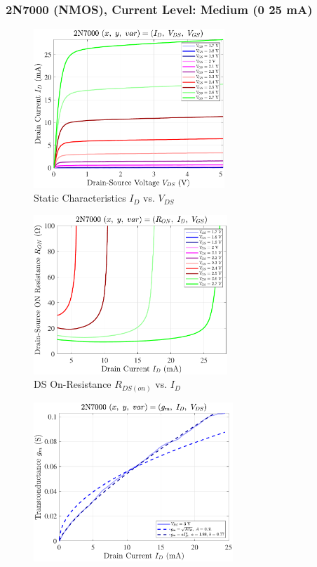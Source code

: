 \documentclass[UTF8]{article}
\begin{document}

\newpage
\subsubsection{2N7000 (NMOS), Current Level: Medium (0 \~ 25 mA)}

\begin{center}
\noindent\begin{minipage}{0.45\columnwidth}
    \begin{figure}[H]\centering
        \includegraphics[height=170pt]{LCE-04-场效应管/assets/2N7000/2N7000 (NMOS) [onsemi, KH32] current level mid (0~25mA)/2025-04-24_00-04-22__stc_Id_Vds_Vgs.pdf}
        \caption{Static Characteristics $I_D$ vs. $V_{DS}$}
    \end{figure}
    \begin{figure}[H]\centering
        \includegraphics[height=170pt]{LCE-04-场效应管/assets/2N7000/2N7000 (NMOS) [onsemi, KH32] current level mid (0~25mA)/2025-04-24_00-00-07__stc_Ron_Id_Vgs.pdf}
        \caption{DS On-Resistance $R_{DS(on)}$ vs. $I_D$}
    \end{figure}
    \begin{figure}[H]\centering
        \includegraphics[height=170pt]{LCE-04-场效应管/assets/2N7000/2N7000 (NMOS) [onsemi, KH32] current level mid (0~25mA)/2025-04-24_00-04-29__stc_gm_Id_Vds.pdf}

\end{figure}
\end{minipage}
\end{center}
\end{document}
